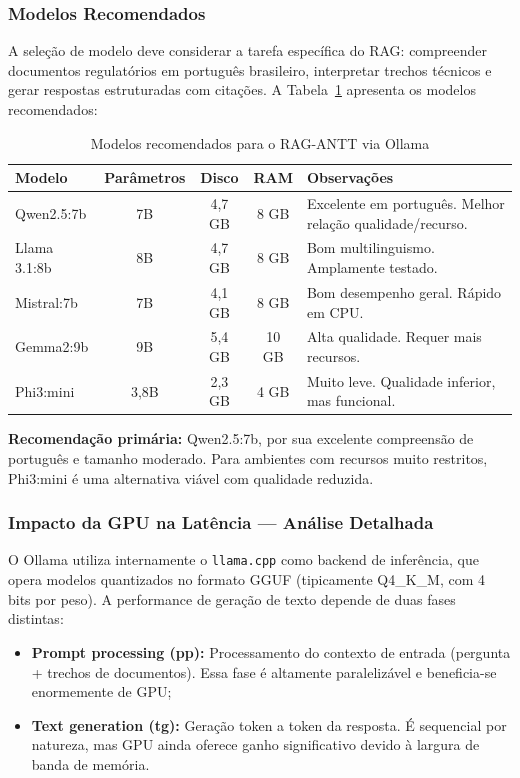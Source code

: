 \documentclass[12pt, a4paper]{article}
\begin{document}
\subsubsection*{Modelos Recomendados}

A seleção de modelo deve considerar a tarefa específica do RAG: compreender documentos regulatórios em português brasileiro, interpretar trechos técnicos e gerar respostas estruturadas com citações. A Tabela~\ref{tab:modelos} apresenta os modelos recomendados:

\begin{table}[H]
\centering
\small
\caption{Modelos recomendados para o RAG-ANTT via Ollama}
\label{tab:modelos}
\begin{tabularx}{\textwidth}{l c c c X}
\toprule
\textbf{Modelo} & \textbf{Parâmetros} & \textbf{Disco} & \textbf{RAM} & \textbf{Observações} \\
\midrule
Qwen2.5:7b & 7B & 4,7 GB & 8 GB & Excelente em português. Melhor relação qualidade/recurso. \\
Llama 3.1:8b & 8B & 4,7 GB & 8 GB & Bom multilinguismo. Amplamente testado. \\
Mistral:7b & 7B & 4,1 GB & 8 GB & Bom desempenho geral. Rápido em CPU. \\
Gemma2:9b & 9B & 5,4 GB & 10 GB & Alta qualidade. Requer mais recursos. \\
Phi3:mini & 3,8B & 2,3 GB & 4 GB & Muito leve. Qualidade inferior, mas funcional. \\
\bottomrule
\end{tabularx}
\end{table}

\noindent\textbf{Recomendação primária:} Qwen2.5:7b, por sua excelente compreensão de português e tamanho moderado. Para ambientes com recursos muito restritos, Phi3:mini é uma alternativa viável com qualidade reduzida.

\subsubsection*{Impacto da GPU na Latência --- Análise Detalhada}

O Ollama utiliza internamente o \texttt{llama.cpp} como backend de inferência, que opera modelos quantizados no formato GGUF (tipicamente Q4\_K\_M, com 4 bits por peso). A performance de geração de texto depende de duas fases distintas:

\begin{itemize}
  \item \textbf{Prompt processing (pp):} Processamento do contexto de entrada (pergunta + trechos de documentos). Essa fase é altamente paralelizável e beneficia-se enormemente de GPU;
  \item \textbf{Text generation (tg):} Geração token a token da resposta. É sequencial por natureza, mas GPU ainda oferece ganho significativo devido à largura de banda de memória.
\end{itemize}
\end{document}
